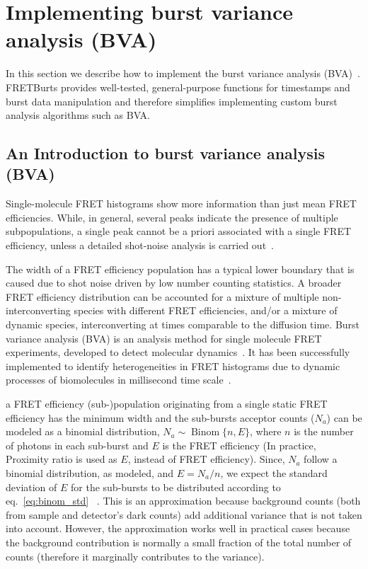 \section{Implementing burst variance analysis (BVA)}


\label{sec:bva}
In this section we describe how to implement the burst variance analysis (BVA)~\cite{Torella_2011}.
FRETBurts provides well-tested, general-purpose functions for timestamps and burst data 
manipulation and therefore simplifies implementing custom burst analysis algorithms such as BVA.

\subsection{An Introduction to burst variance analysis (BVA)}
Single-molecule FRET histograms show more information than just mean FRET efficiencies. 
While, in general, several peaks indicate the presence of multiple subpopulations, 
a single peak cannot be a priori associated with a single FRET efficiency,
unless a detailed shot-noise analysis is carried out~\cite{Nir_2006,Antonik2006}.

The width of a FRET efficiency population has a typical lower boundary that is caused due to shot noise driven by low number counting statistics. A broader FRET efficiency distribution can be accounted for a mixture of multiple non-interconverting species with different FRET efficiencies, and/or a mixture of dynamic species, interconverting at times comparable to the diffusion time. Burst variance analysis (BVA) is an analysis method for single molecule FRET experiments, developed to detect molecular dynamics~\cite{Torella_2011}. It has been successfully implemented to identify heterogeneities in FRET histograms due to dynamic processes of biomolecules in millisecond time scale~\cite{Torella_2011, Robb_2013}.

a FRET efficiency (sub-)population originating from a single static FRET efficiency has the minimum width and the sub-bursts acceptor counts ($N_a$) can be modeled as a binomial distribution, 
$N_a \sim \operatorname{Binom} \{n, E\}$, where $n$ is the number of photons in each sub-burst and 
$E$ is the FRET efficiency (In practice, Proximity ratio is used as $E$, instead of FRET efficiency). Since, $N_a$ follow a binomial distribution, as modeled, and $E = N_a/n$, we expect the standard deviation of $E$ for the sub-bursts to be distributed according to eq.~\ref{eq:binom_std} ~\cite{Torella_2011}. 
This is an approximation because background counts (both from sample and detector's dark counts) add additional variance that is not taken into account. However, the approximation works well in practical cases because the background contribution
is normally a small fraction of the total number of counts (therefore it marginally contributes to the variance).

